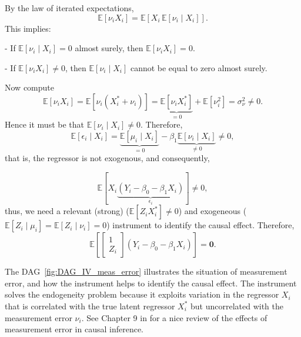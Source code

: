 By the law of iterated expectations, 
\[
\mathbb{E}[\nu_i X_i] = \mathbb{E}\!\left[X_i \, \mathbb{E}[\nu_i \mid X_i]\right].
\]
This implies:

- If $\mathbb{E}[\nu_i \mid X_i] = 0$ almost surely, then $\mathbb{E}[\nu_i X_i] = 0$.  

- If $\mathbb{E}[\nu_i X_i] \neq 0$, then $\mathbb{E}[\nu_i \mid X_i]$ cannot be equal to zero almost surely.

Now compute
\[
\mathbb{E}[\nu_iX_i] 
= \mathbb{E}[\nu_i(X_i^*+\nu_i)]
= \underbrace{\mathbb{E}[\nu_i X_i^*]}_{=0} + \mathbb{E}[\nu_i^2]
= \sigma^2_{\nu} \neq 0.
\]
Hence it must be that $\mathbb{E}[\nu_i\mid X_i]\neq 0$. Therefore,
\[
\mathbb{E}[\epsilon_i\mid X_i]
=\underbrace{\mathbb{E}[\mu_i\mid X_i]}_{=0}
- \beta_1\underbrace{\mathbb{E}[\nu_i\mid X_i]}_{\neq 0}
\neq 0,
\]
that is, the regressor is not exogenous, and consequently,

\[
\mathbb{E}[X_i\underbrace{(Y_i-\beta_0-\beta_1X_i)}_{\epsilon_i}]\neq 0,
\] 
thus, we need a relevant (strong) ($\mathbb{E}[Z_iX_i^*]\neq 0$) and exogeneous ($\mathbb{E}[Z_i\mid \mu_i]=\mathbb{E}[Z_i\mid \nu_i]= 0$) instrument to identify the causal effect. Therefore,
\[
\mathbb{E}\left[\begin{bmatrix}
	1\\
	Z_i
\end{bmatrix}(Y_i-\beta_0-\beta_1X_i)\right]=\mathbf{0}.
\] 

The DAG~\ref{fig:DAG_IV_meas_error} illustrates the situation of measurement error, and how the instrument helps to identify the causal effect. The instrument solves the endogeneity problem because it exploits variation in the regressor $X_i$ that is correlated with the true latent regressor $X_i^*$ but uncorrelated with the measurement error $\nu_i$. See Chapter 9 in \cite{hernan2020causal} for a nice review of the effects of measurement error in causal inference.

